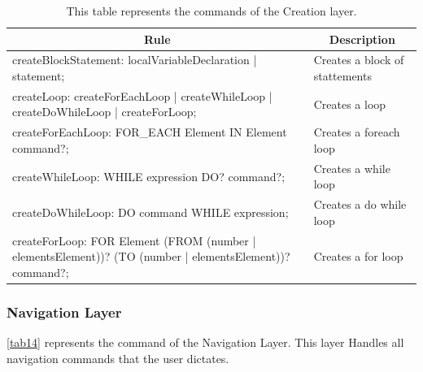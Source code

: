 \begin{table}[H]
	\centering
	\begin{tabular}{|p{8cm}|p{7cm}|}
		\hline
		\multicolumn{1}{|c|}{{\bf Rule}} & \multicolumn{1}{c|}{{\bf Description}} \\ \hline
		createBlockStatement: localVariableDeclaration | statement;                                                                                             & Creates a block of stattements         \\ \hline
		createLoop: createForEachLoop | createWhileLoop | createDoWhileLoop | createForLoop;                                                                    & Creates a loop                         \\ \hline
		createForEachLoop: FOR\_EACH Element IN Element command?;                                                                                               & Creates a foreach loop                 \\ \hline
		createWhileLoop: WHILE expression DO? command?;                                                                                                         & Creates a while loop                   \\ \hline
		createDoWhileLoop: DO command WHILE expression;                                                                                                         & Creates a do while loop                \\ \hline
		createForLoop: FOR Element (FROM (number | elementsElement))? (TO (number | elementsElement))? command?;                                                & Creates a for loop                     \\ \hline
	\end{tabular}
	\caption{This table represents the commands of the Creation layer.}
	\label{tab13}
\end{table}
\subsubsection{Navigation Layer}
\autoref{tab14} represents the command of the Navigation Layer.  This layer Handles all navigation commands that the user dictates.

